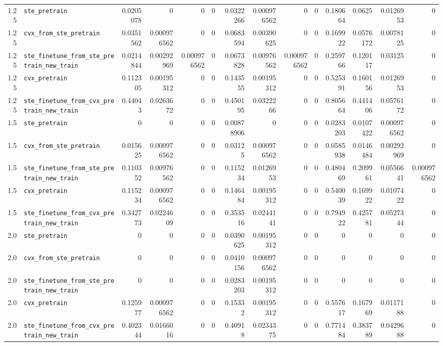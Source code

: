 \begin{longtable}{@{}r l *{12}{r}@{}}
1.25 & \texttt{ste\_pretrain} & 0.0205078 & 0 & 0 & 0 & 0.0322266 & 0.000976562 & 0 & 0 & 0.180664 & 0.0625 & 0.0126953 & 0 \\
1.25 & \texttt{cvx\_from\_ste\_pretrain} & 0.0351562 & 0.000976562 & 0 & 0 & 0.0683594 & 0.00390625 & 0 & 0 & 0.169922 & 0.0576172 & 0.0078125 & 0 \\
1.25 & \texttt{ste\_finetune\_from\_ste\_pretrain\_new\_train} & 0.0214844 & 0.00292969 & 0.000976562 & 0 & 0.0673828 & 0.00976562 & 0.000976562 & 0 & 0.259766 & 0.120117 & 0.03125 & 0 \\
1.25 & \texttt{cvx\_pretrain} & 0.112305 & 0.00195312 & 0 & 0 & 0.143555 & 0.00195312 & 0 & 0 & 0.525391 & 0.160156 & 0.0126953 & 0 \\
1.25 & \texttt{ste\_finetune\_from\_cvx\_pretrain\_new\_train} & 0.44043 & 0.0263672 & 0 & 0 & 0.450195 & 0.0322266 & 0 & 0 & 0.805664 & 0.441406 & 0.0576172 & 0 \\
1.5 & \texttt{ste\_pretrain} & 0 & 0 & 0 & 0 & 0.00878906 & 0 & 0 & 0 & 0.0283203 & 0.0107422 & 0.000976562 & 0 \\
1.5 & \texttt{cvx\_from\_ste\_pretrain} & 0.015625 & 0.000976562 & 0 & 0 & 0.03125 & 0.000976562 & 0 & 0 & 0.0585938 & 0.0146484 & 0.00292969 & 0 \\
1.5 & \texttt{ste\_finetune\_from\_ste\_pretrain\_new\_train} & 0.110352 & 0.00976562 & 0 & 0 & 0.115234 & 0.0126953 & 0 & 0 & 0.480469 & 0.209961 & 0.0556641 & 0.000976562 \\
1.5 & \texttt{cvx\_pretrain} & 0.115234 & 0.000976562 & 0 & 0 & 0.146484 & 0.00195312 & 0 & 0 & 0.540039 & 0.169922 & 0.0107422 & 0 \\
1.5 & \texttt{ste\_finetune\_from\_cvx\_pretrain\_new\_train} & 0.342773 & 0.0224609 & 0 & 0 & 0.353516 & 0.0244141 & 0 & 0 & 0.794922 & 0.425781 & 0.0527344 & 0 \\
2.0 & \texttt{ste\_pretrain} & 0 & 0 & 0 & 0 & 0.0390625 & 0.00195312 & 0 & 0 & 0 & 0 & 0 & 0 \\
2.0 & \texttt{cvx\_from\_ste\_pretrain} & 0 & 0 & 0 & 0 & 0.0410156 & 0.000976562 & 0 & 0 & 0 & 0 & 0 & 0 \\
2.0 & \texttt{ste\_finetune\_from\_ste\_pretrain\_new\_train} & 0 & 0 & 0 & 0 & 0.0283203 & 0.00195312 & 0 & 0 & 0 & 0 & 0 & 0 \\
2.0 & \texttt{cvx\_pretrain} & 0.125977 & 0.000976562 & 0 & 0 & 0.15332 & 0.00195312 & 0 & 0 & 0.557617 & 0.167969 & 0.0117188 & 0 \\
2.0 & \texttt{ste\_finetune\_from\_cvx\_pretrain\_new\_train} & 0.402344 & 0.0166016 & 0 & 0 & 0.40918 & 0.0234375 & 0 & 0 & 0.771484 & 0.383789 & 0.0429688 & 0 \\

\end{longtable}
